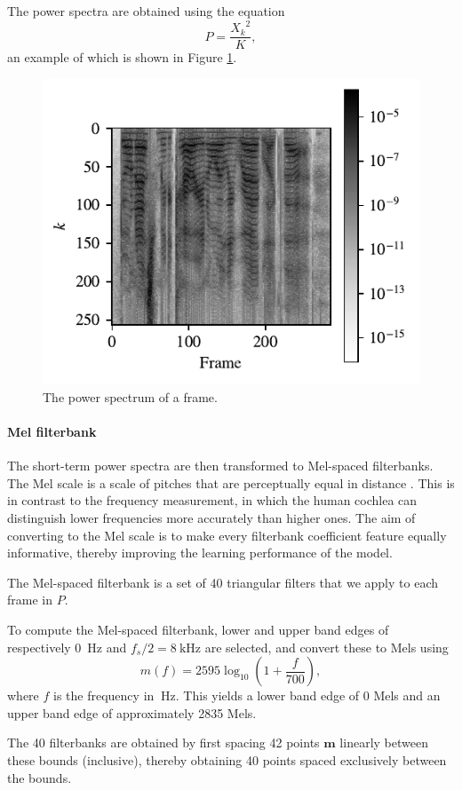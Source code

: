 			The power spectra are obtained using the equation
			\begin{equation}\label{eq:powframes}
				P = \frac{{X_k}^2}{K},
			\end{equation}
			an example of which is shown in Figure \ref{fig:powframes}.

			\begin{figure}[ht]
				\centering
			    \includegraphics[width=0.45\linewidth]{gfx/powframes}
			    \caption{The power spectrum of a frame.}
			    \label{fig:powframes}
			\end{figure}

		\paragraph{Mel filterbank}

			The short-term power spectra are then transformed to Mel-spaced filterbanks.
			The Mel scale is a scale of pitches that are perceptually equal in distance \citep{stevens1937scale}.
			This is in contrast to the frequency measurement, in which the human cochlea can distinguish lower frequencies more accurately than higher ones.
			The aim of converting to the Mel scale is to make every filterbank coefficient feature equally informative, thereby improving the learning performance of the model.

			The Mel-spaced filterbank is a set of 40 triangular filters that we apply to each frame in $P$.

			To compute the Mel-spaced filterbank, lower and upper band edges of respectively \SI{0}{\Hz} and $f_s/2 = \SI{8}{\kHz}$ are selected, and convert these to Mels using
			\begin{equation}
				m(f) = 2595\log_{10}\left(1 + \frac{f}{700}\right),
			\end{equation}
			where $f$ is the frequency in $\SI{}{\Hz}$.
			This yields a lower band edge of 0 Mels and an upper band edge of approximately 2835 Mels.

			The 40 filterbanks are obtained by first spacing 42 points $\mathbf{m}$ linearly between these bounds (inclusive), thereby obtaining 40 points spaced exclusively between the bounds.

